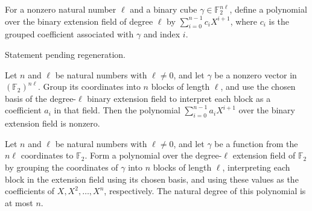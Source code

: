 \begin{definition}
\label{FABL.basisExpandedSmallBiasPolynomial}
\leanok
{}
For a nonzero natural number $\ell$ and a binary cube $\gamma\in\mathbb{F}_2^{n\ell}$,
define a polynomial over the binary extension field of degree $\ell$ by
$\sum_{i=0}^{n-1} c_i X^{i+1}$, where $c_i$ is the grouped coefficient associated with
$\gamma$ and index $i$.
\end{definition}

\begin{theorem}
\label{FABL.basisExpandedSmallBiasPolynomial_eval}
\leanok
{}
Statement pending regeneration.
\end{theorem}

\begin{theorem}
\label{FABL.basisExpandedSmallBiasPolynomial_ne_zero}
\leanok
{}
Let $n$ and $\ell$ be natural numbers with $\ell \ne 0$, and let $\gamma$ be a nonzero
vector in $(\mathbb{F}_2)^{n\ell}$. Group its coordinates into $n$ blocks of length
$\ell$, and use the chosen basis of the degree-$\ell$ binary extension field to
interpret each block as a coefficient $a_i$ in that field. Then the polynomial
$\sum_{i=0}^{n-1} a_i X^{i+1}$ over the binary extension field is nonzero.
\end{theorem}

\begin{theorem}
\label{FABL.basisExpandedSmallBiasPolynomial_natDegree_le}
\leanok
{}
Let $n$ and $\ell$ be natural numbers with $\ell \ne 0$, and let $\gamma$ be a function
from the $n\ell$ coordinates to $\mathbb{F}_2$. Form a polynomial over the degree-$\ell$
extension field of $\mathbb{F}_2$ by grouping the coordinates of $\gamma$ into $n$
blocks of length $\ell$, interpreting each block in the extension field using its chosen
basis, and using these values as the coefficients of $X, X^2, \ldots, X^n$,
respectively. The natural degree of this polynomial is at most $n$.
\end{theorem}

